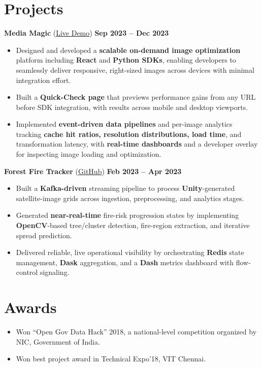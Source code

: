 \documentclass[letterpaper]{article}
\begin{document}
\vspace{0pt}

\section*{Projects}
\textbf{Media Magic} (\href{https://media-magic.umangshah.me}{Live Demo}) \hfill \textbf{Sep 2023 -- Dec 2023} \\
\vspace{2pt}
\begin{itemize}
  \item Designed and developed a \textbf{scalable on-demand image optimization} platform including \textbf{React} and \textbf{Python SDKs}, enabling developers to seamlessly deliver responsive, right-sized images across devices with minimal integration effort.
  \item Built a \textbf{Quick-Check page} that previews performance gains from any URL before SDK integration, with results across mobile and desktop viewports.
  \item Implemented \textbf{event-driven data pipelines} and per-image analytics tracking \textbf{cache hit ratios, resolution distributions, load time}, and transformation latency, with \textbf{real-time dashboards} and a developer overlay for inspecting image loading and optimization.
\end{itemize}

\textbf{Forest Fire Tracker} (\href{https://github.com/umangshah-js/forest-fire-tracker}{GitHub}) \hfill \textbf{Feb 2023 -- Apr 2023} \\
\vspace{2pt}
\begin{itemize}
  \item Built a \textbf{Kafka-driven} streaming pipeline to process \textbf{Unity}-generated satellite-image grids across ingestion, preprocessing, and analytics stages.
  \item Generated \textbf{near-real-time} fire-risk progression states by implementing \textbf{OpenCV}-based tree/cluster detection, fire-region extraction, and iterative spread prediction.
  \item Delivered reliable, live operational visibility by orchestrating \textbf{Redis} state management, \textbf{Dask} aggregation, and a \textbf{Dash} metrics dashboard with flow-control signaling.
\end{itemize}

\vspace{0pt}

\section*{Awards}
\begin{itemize}
  \item Won ``Open Gov Data Hack'' 2018, a national-level competition organized by NIC, Government of India.
  \item Won best project award in Technical Expo'18, VIT Chennai.
\end{itemize}
\end{document}
